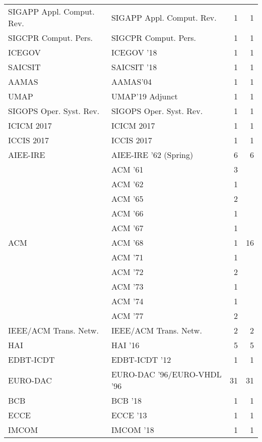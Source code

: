 \begin{table*}[t]
\begin{tabular}{llrr}
\multirow{1}{*}{SIGAPP Appl. Comput. Rev.} & SIGAPP Appl. Comput. Rev. & 1 & \multirow{1}{*}{1}\\
\multirow{1}{*}{SIGCPR Comput. Pers.} & SIGCPR Comput. Pers. & 1 & \multirow{1}{*}{1}\\
\multirow{1}{*}{ICEGOV } & ICEGOV '18 & 1 & \multirow{1}{*}{1}\\
\multirow{1}{*}{SAICSIT } & SAICSIT '18 & 1 & \multirow{1}{*}{1}\\
\multirow{1}{*}{AAMAS} & AAMAS'04 & 1 & \multirow{1}{*}{1}\\
\multirow{1}{*}{UMAP} & UMAP'19 Adjunct & 1 & \multirow{1}{*}{1}\\
\multirow{1}{*}{SIGOPS Oper. Syst. Rev.} & SIGOPS Oper. Syst. Rev. & 1 & \multirow{1}{*}{1}\\
\multirow{1}{*}{ICICM 2017} & ICICM 2017 & 1 & \multirow{1}{*}{1}\\
\multirow{1}{*}{ICCIS 2017} & ICCIS 2017 & 1 & \multirow{1}{*}{1}\\
\multirow{1}{*}{AIEE-IRE } & AIEE-IRE '62 (Spring) & 6 & \multirow{1}{*}{6}\\
\multirow{11}{*}{ACM } & ACM '61 & 3 & \multirow{11}{*}{16}\\
& ACM '62 & 1 &\\
& ACM '65 & 2 &\\
& ACM '66 & 1 &\\
& ACM '67 & 1 &\\
& ACM '68 & 1 &\\
& ACM '71 & 1 &\\
& ACM '72 & 2 &\\
& ACM '73 & 1 &\\
& ACM '74 & 1 &\\
& ACM '77 & 2 &\\
\multirow{1}{*}{IEEE/ACM Trans. Netw.} & IEEE/ACM Trans. Netw. & 2 & \multirow{1}{*}{2}\\
\multirow{1}{*}{HAI } & HAI '16 & 5 & \multirow{1}{*}{5}\\
\multirow{1}{*}{EDBT-ICDT } & EDBT-ICDT '12 & 1 & \multirow{1}{*}{1}\\
\multirow{1}{*}{EURO-DAC } & EURO-DAC '96/EURO-VHDL '96 & 31 & \multirow{1}{*}{31}\\
\multirow{1}{*}{BCB } & BCB '18 & 1 & \multirow{1}{*}{1}\\
\multirow{1}{*}{ECCE } & ECCE '13 & 1 & \multirow{1}{*}{1}\\
\multirow{1}{*}{IMCOM } & IMCOM '18 & 1 & \multirow{1}{*}{1}\\

\end{tabular}
\end{table*}
